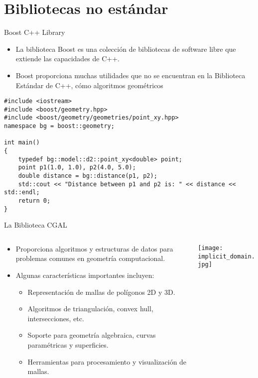 \documentclass{beamer}
\begin{document}
\section{Bibliotecas no estándar}

\begin{frame}[fragile]{Boost C++ Library}

\begin{itemize}
\small
\item La biblioteca Boost es una colección de bibliotecas de software libre que extiende las capacidades de C++.
\item Boost proporciona muchas utilidades que no se encuentran en la Biblioteca Estándar de C++, cómo algoritmos geométricos
\end{itemize}

\begin{verbatim}
#include <iostream>
#include <boost/geometry.hpp>
#include <boost/geometry/geometries/point_xy.hpp>
namespace bg = boost::geometry;

int main()
{
    typedef bg::model::d2::point_xy<double> point;
    point p1(1.0, 1.0), p2(4.0, 5.0);
    double distance = bg::distance(p1, p2);
    std::cout << "Distance between p1 and p2 is: " << distance << std::endl;
    return 0;
}
\end{verbatim}

\end{frame}

\begin{frame}{La Biblioteca CGAL}
\begin{columns}[T]
\begin{column}{0.6\textwidth}
\begin{itemize}
\item Proporciona algoritmos y estructuras de datos para problemas comunes en geometría computacional.
\item Algunas características importantes incluyen:
\begin{itemize}
\item Representación de mallas de polígonos 2D y 3D.
\item Algoritmos de triangulación, convex hull, intersecciones, etc.
\item Soporte para geometría algebraica, curvas paramétricas y superficies.
\item Herramientas para procesamiento y visualización de mallas.
\end{itemize}
\end{itemize}
\end{column}
\begin{column}{0.4\textwidth}
\begin{center}
\texttt{[image: implicit\_domain.jpg]}
\end{center}
\end{column}
\end{columns}
\end{frame}
\end{document}

